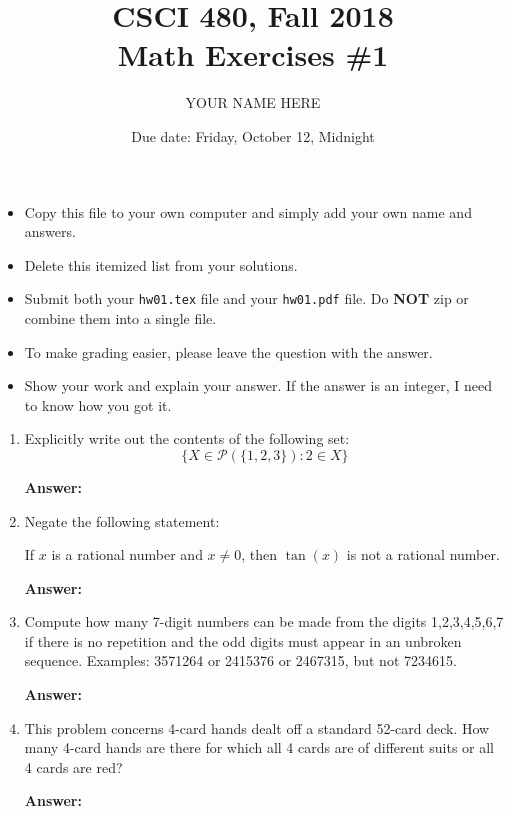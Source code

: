 \documentclass{article}
\title{CSCI 480, Fall 2018\\Math Exercises \#1}
\author{YOUR NAME HERE}
\date{Due date: Friday, October 12, Midnight}
\begin{document}
\maketitle

\begin{itemize}
\item  Copy this file to your own computer and simply add your
  own  name and  answers.
\item   Delete this itemized list from your solutions.
\item Submit both your {\tt hw01.tex} file and your {\tt hw01.pdf}
  file.  Do {\bf NOT} zip or combine them into a single file.
\item
  To make grading easier, please leave the question with
  the answer.
\item
  Show your work and explain your answer.
  If the answer is an integer, I need to know how you
  got it.
\end{itemize}

\begin{enumerate}

\item Explicitly write out the contents of the following set:
  \[ \{X\in \mathcal{P}(\{1,2,3\}) : 2\in X\}\]

  {\bf Answer:}
  

\item Negate the following statement:

  If $x$ is a rational number and $x\neq 0$, then $\tan(x)$
  is not a rational number.

  {\bf Answer:}
  

\item Compute how many 7-digit numbers can be made from the digits
  1,2,3,4,5,6,7 if there is no repetition and the odd digits must
  appear in an unbroken sequence.  Examples: 3571264 or 2415376 or 2467315,
  but not 7234615.


  {\bf Answer:}
  
\item
  This problem concerns 4-card hands dealt off a standard 52-card deck.
  How many 4-card hands are there for which all 4 cards are of different
  suits or all 4 cards are red?


  {\bf Answer:}
  
\end{enumerate}
\end{document}
